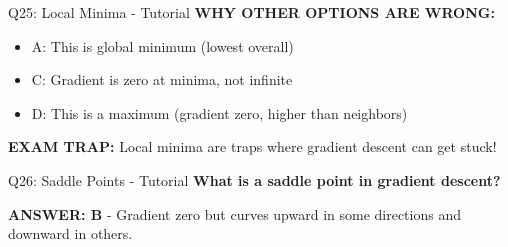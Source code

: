 \documentclass[8pt]{beamer}
\begin{document}
\begin{frame}{Q25: Local Minima - Tutorial}
		\vspace{0.05cm}
		\textcolor{myred}{\textbf{WHY OTHER OPTIONS ARE WRONG:}}
		\begin{itemize}
			\item \textcolor{myred}{A:} This is global minimum (lowest overall)
			\item \textcolor{myred}{C:} Gradient is zero at minima, not infinite
			\item \textcolor{myred}{D:} This is a maximum (gradient zero, higher than neighbors)
		\end{itemize}
		
		\textcolor{myred}{\textbf{EXAM TRAP:}} Local minima are \textcolor{myred}{traps} where gradient descent can get stuck!
	\end{frame}
	
	\begin{frame}{Q26: Saddle Points - Tutorial}
		\fontsize{6.5}{7.5}\selectfont
		\textbf{What is a saddle point in gradient descent?}
		
		\vspace{0.05cm}
		\textcolor{myblue}{\textbf{ANSWER: B}} - Gradient zero but curves upward in some directions and downward in others.
		

\end{frame}
\end{document}
